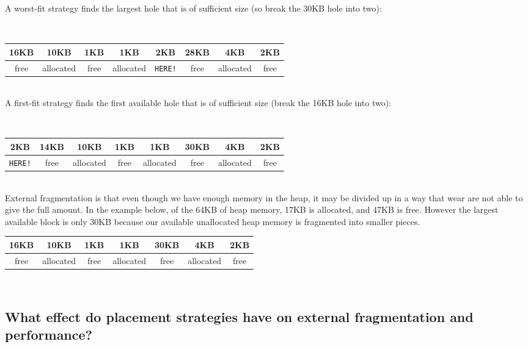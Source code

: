 A worst-fit strategy finds the largest hole that is of sufficient size (so break the 30KB hole into two):

\\
\begin{center}
\begin{tabular}{ | c | c | c | c | c | c | c | c | }
\hline
16KB & 10KB & 1KB & 1KB & 2KB & 28KB & 4KB & 2KB \\ \hline
free & allocated & free & allocated & \texttt{HERE!} & free & allocated & free \\
\hline
\end{tabular}
\end{center}
\\

A first-fit strategy finds the first available hole that is of sufficient size (break the 16KB hole into two):

\\
\begin{center}
\begin{tabular}{ | c | c | c | c | c | c | c | c | }
\hline
2KB & 14KB & 10KB & 1KB & 1KB & 30KB & 4KB & 2KB \\ \hline
\texttt{HERE!} & free & allocated & free & allocated & free & allocated & free \\
\hline
\end{tabular}
\end{center}
\\

External fragmentation is that even though we have enough memory in the heap, it may be divided up in a way that wear are not able to give the full amount. In the example below, of the 64KB of heap memory, 17KB is allocated, and 47KB is free. However the largest available block is only 30KB because our available unallocated heap memory is fragmented into smaller pieces.
\\
\begin{center}
\begin{tabular}{ | c | c | c | c | c | c | c | }
\hline
16KB & 10KB & 1KB & 1KB & 30KB & 4KB & 2KB \\ \hline
free & allocated & free & allocated & free & allocated & free \\
\hline
\end{tabular}
\end{center}
\\

\subsection{What effect do placement strategies have on external fragmentation and performance?}

